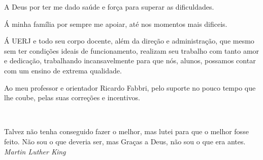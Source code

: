 \documentclass[a4paper,12pt,oneside,onecolumn,final,fleqn]{repUERJ}
\theoremstyle{plain}
\theoremstyle{definition}
\begin{document}




A Deus por ter me dado saúde e força para superar as dificuldades.


Á minha família por sempre me apoiar, até nos momentos mais dificeis.


Á UERJ e todo seu corpo docente, além da direção e administração, que mesmo sem ter condições ideais de funcionamento, realizam seu trabalho com tanto amor e dedicação, trabalhando incansavelmente para que nós, alunos, possamos contar com um ensino de extrema qualidade.


Ao meu professor e orientador Ricardo Fabbri, pelo suporte no pouco tempo que lhe coube, pelas suas correções e incentivos.


\pretextualchapter{}

  \vfill\
  \begin{flushright}
 Talvez não tenha conseguido fazer o melhor, mas lutei para que o melhor fosse feito. Não sou o que deveria ser, mas Graças a Deus, não sou o que era antes. \\
    \textsl{Martin Luther King}
  \end{flushright}



\end{document}
